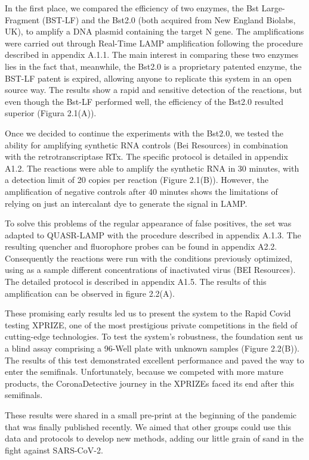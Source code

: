 In the first place, we compared the efficiency of two enzymes, the Bst Large-Fragment (BST-LF) and the Bst2.0 (both acquired from New England Biolabs, UK), to amplify a DNA plasmid containing the target N gene. The amplifications were carried out through Real-Time LAMP amplification following the procedure described in appendix A.1.1. The main interest in comparing these two enzymes lies in the fact that, meanwhile, the Bst2.0 is a proprietary patented enzyme, the BST-LF patent is expired, allowing anyone to replicate this system in an open source way. The results show a rapid and sensitive detection of the reactions, but even though the Bst-LF performed well, the efficiency of the Bst2.0 resulted superior (Figura 2.1(A)).

Once we decided to continue the experiments with the Bst2.0, we tested the ability for amplifying synthetic RNA controls (Bei Resources) in combination with the retrotranscriptase RTx. The specific protocol is detailed in appendix A1.2. The reactions were able to amplify the synthetic RNA in 30 minutes, with a detection limit of 20 copies per reaction (Figure 2.1(B)). However, the amplification of negative controls after 40 minutes shows the limitations of relying on just an intercalant dye to generate the signal in LAMP.

To solve this problems of the regular appearance of false positives, the set was adapted to QUASR-LAMP with the procedure described in appendix A.1.3. The resulting quencher and fluorophore probes can be found in appendix A2.2. Consequently the reactions were run with the conditions previously optimized, using as a sample different concentrations of inactivated virus (BEI Resources). The detailed protocol is described in appendix A1.5. The results of this amplification can be observed in figure 2.2(A).

These promising early results led us to present the system to the Rapid Covid testing XPRIZE, one of the most prestigious private competitions in the field of cutting-edge technologies. To test the system's robustness, the foundation sent us a blind assay comprising a 96-Well plate with unknown samples (Figure 2.2(B)). The results of this test demonstrated excellent performance and paved the way to enter the semifinals\cite{marianna_limas_xprize_2020}. Unfortunately, because we competed with more mature products, the CoronaDetective journey in the XPRIZEs faced its end after this semifinals.

These results were shared in a small pre-print at the beginning of the pandemic that was finally published recently\cite{aidelberg_corona_2021}. We aimed that other groups could use this data and protocols to develop new methods, adding our little grain of sand in the fight against SARS-CoV-2.
 
